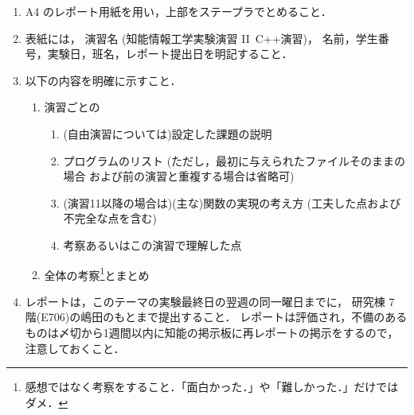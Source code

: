\documentclass[11pt,a4,epsf]{jarticle}
\begin{document}
\begin{enumerate}
 \item A4 のレポート用紙を用い，上部をステープラでとめること．
 \item 表紙には，
演習名 (知能情報工学実験演習 II\ C++演習)，
名前，学生番号，実験日，班名，レポート提出日を明記すること．
 \item 以下の内容を明確に示すこと．
 \begin{enumerate}
  \item 演習ごとの
  \begin{enumerate}
   \item (自由演習については)設定した課題の説明
   \item プログラムのリスト
(ただし，最初に与えられたファイルそのままの場合
および前の演習と重複する場合は省略可)
   \item (演習11以降の場合は)(主な)関数の実現の考え方
(工夫した点および不完全な点を含む)
   \item 考察あるいはこの演習で理解した点
  \end{enumerate}
  \item 全体の考察\footnote{感想ではなく考察をすること．「面白かった．」や「難しかった．」だけではダメ．}とまとめ
 \end{enumerate}
 \item レポートは，このテーマの実験最終日の翌週の同一曜日までに，
研究棟 7 階(E706)の嶋田のもとまで提出すること．
レポートは評価され，不備のあるものは〆切から1週間以内に知能の掲示板に再レポートの掲示をするので，注意しておくこと．
\end{enumerate}
\end{document}
